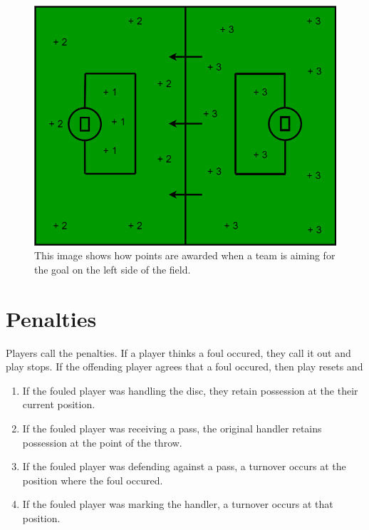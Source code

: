\documentclass[10pt]{article}
\begin{document}
\begin{figure}[H]

    \includegraphics[width=.75\textwidth]{field/field_points}
    \caption{This image shows how points are awarded when a team is aiming for the goal on the left side of the field.}

\end{figure}

\section{Penalties}

Players call the penalties. If a player thinks a foul occured, they call it out and play stops. If the offending player agrees that a foul occured, then play resets and
\begin{enumerate}
    \item If the fouled player was handling the disc, they retain possession at the their current position.
    \item If the fouled player was receiving a pass, the original handler retains possession at the point of the throw.
    \item If the fouled player was defending against a pass, a turnover occurs at the position where the foul occured.
    \item If the fouled player was marking the handler, a turnover occurs at that position.
\end{enumerate}
\end{document}
